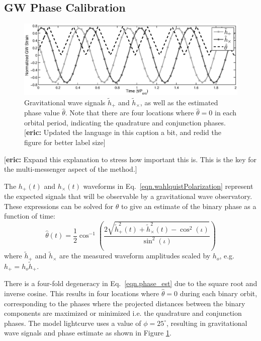 \documentclass[preprint2]{aastex}
\newcommand{\eric}[1]{{\color{cyan}[\textbf{eric:} #1]}}
\begin{document}
\subsection{GW Phase Calibration}
\label{sec.GWcal}

\begin{figure}[t]
\centering
\includegraphics[width=\textwidth]{./figs/GWphase.eps}
\caption{Gravitational wave signals $\tilde{h}_+$ and
$\tilde{h}_{\times}$, as well as the estimated phase value
$\hat{\theta}$. Note that there are four locations where $\hat{\theta}=0$ in each orbital period, 
indicating the quadrature and conjunction phases. \eric{Updated the language in this caption a bit, and redid the figure
 for better label size}}
\label{fig.GWphase}
\end{figure}

\eric{Expand this explanation to stress how important this is. This is the key for the multi-messenger aspect of the method.}

The $h_+(t)$ and $h_\times(t)$ waveforms in Eq.\
\ref{eqn.wahlquistPolarization} represent the expected signals that
will be observable by a gravitational wave observatory.  These
expressions can be solved for $\theta$ to give an estimate of the
binary phase as a function of time:
\begin{equation} \label{eqn.phase_est}
   \hat{\theta}(t) = \dfrac{1}{2}\cos^{-1}\left (
   \dfrac{2\sqrt{\tilde{h}_+^2(t) + \tilde{h}_\times^2(t) -
   \cos^2(\iota)}}{\sin^2(\iota)}\right )
\end{equation}
where $\tilde{h}_+$ and $\tilde{h}_{\times}$ are the measured
waveform amplitudes scaled by $h_{o}$, e.g. $h_+ = h_{o}\tilde{h}_+$.

There is a four-fold degeneracy in Eq.\ \ref{eqn.phase_est} due
to the square root and inverse cosine. This results in four locations
where $\hat{\theta}=0$ during each binary orbit, corresponding to the
phases where the projected distances between the binary components are maximized or minimized i.e. the quadrature and conjunction phases. 
The model lightcurve uses a value of $\phi=25^{\circ}$, resulting in
gravitational wave signals and phase estimate as shown in Figure
\ref{fig.GWphase}.
\end{document}
